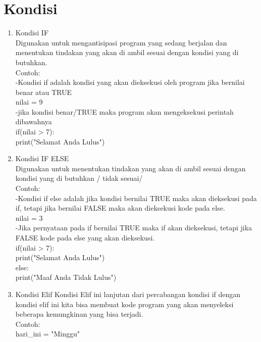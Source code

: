 \section*{Kondisi}
\begin{enumerate}
\item Kondisi IF\\
Digunakan untuk mengantisipasi program yang sedang berjalan dan menentukan tindakan yang akan di ambil sesuai dengan kondisi yang di butuhkan.\\
Contoh:\\
-Kondisi if adalah kondisi yang akan dieksekusi oleh program jika bernilai benar atau TRUE\\

nilai = 9\\

-jika kondisi benar/TRUE maka program akan mengeksekusi perintah dibawahnya\\
if(nilai > 7):\\
    print("Selamat Anda Lulus")\\
\item Kondisi IF ELSE\\
Digunakan untuk  menentukan tindakan yang akan di ambil sesuai dengan kondisi yang di butuhkan / tidak sesuai/\\
Contoh:\\
    -Kondisi if else adalah jika kondisi bernilai TRUE maka akan dieksekusi pada if, tetapi jika bernilai FALSE maka akan dieksekusi kode pada else.\\

nilai = 3\\
-Jika pernyataan pada if bernilai TRUE maka if akan dieksekusi, tetapi jika FALSE kode pada else yang akan dieksekusi.\\
if(nilai > 7):\\
    print("Selamat Anda Lulus")\\
else:\\
    print("Maaf Anda Tidak Lulus")\\
\item Kondisi Elif
Kondisi Elif ini lanjutan dari percabangan kondisi if dengan kondisi elif ini kita bisa membuat kode program yang akan menyeleksi beberapa kemungkinan yang bisa terjadi.\\
Contoh:\\
hari\_ini = "Minggu"\\


\end{enumerate}
